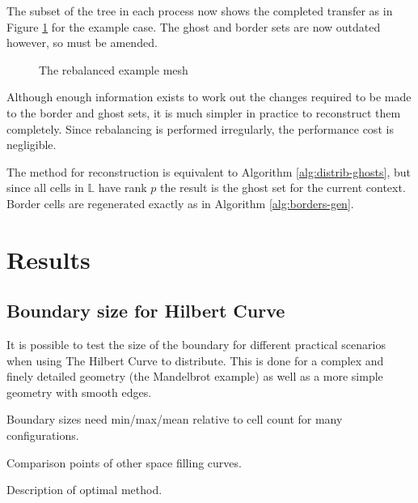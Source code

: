 \documentclass{IIBproject}
\numberwithin{figure}{section}
\begin{document}
            The subset of the tree in each process now shows the completed transfer as in Figure \ref{fig:rebalance-final} for the example case. The ghost and border sets are now outdated however, so must be amended.

            \begin{figure}[H]
                
                \caption{The rebalanced example mesh}
                \label{fig:rebalance-final}
            \end{figure}


            Although enough information exists to work out the changes required to be made to the border and ghost sets, it is much simpler in practice to reconstruct them completely. Since rebalancing is performed irregularly, the performance cost is negligible.

            The method for reconstruction is equivalent to Algorithm \ref{alg:distrib-ghosts}, but since all cells in $\mathbb{L}$ have rank $p$ the result is the ghost set for the current context. Border cells are regenerated exactly as in Algorithm \ref{alg:borders-gen}.





\section{Results} %
    \label{sec:results}

    \subsection{Boundary size for Hilbert Curve}
        \label{sec:results-boundarysize}

        It is possible to test the size of the boundary for different practical scenarios when using The Hilbert Curve to distribute. This is done for a complex and finely detailed geometry (the Mandelbrot example) as well as a more simple geometry with smooth edges.

        Boundary sizes need min/max/mean relative to cell count for many configurations.

        Comparison points of other space filling curves.

        Description of optimal method.

\end{document}
